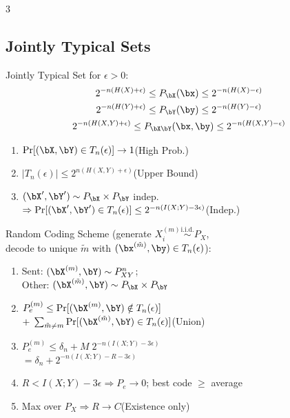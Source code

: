\documentclass[12pt, a4paper]{article}
\begin{document}
\begin{multicols*}{3}
\colbreak
\subsection{Jointly Typical Sets}
Jointly Typical Set for $\epsilon>0$:
\begin{gather*}
  2^{-n(H(X) + \epsilon)} \leq P_{\bX}(\bx) \leq 2^{-n(H(X)-\epsilon)}\\
  2^{-n(H(Y) + \epsilon)} \leq P_{\bY}(\by) \leq 2^{-n(H(Y)-\epsilon)}\\
  2^{-n(H(X, Y) + \epsilon)} \leq P_{\bX\bY}(\bx, \by) \leq 2^{-n(H(X, Y)-\epsilon)}
\end{gather*}
\begin{enumerate}[\roman*.]
  \item $\Pr[(\bX,\bY)\in T_n(\epsilon)]\to 1$\hfill(High Prob.)
  \item $|T_n(\epsilon)|\le 2^{n(H(X,Y)+\epsilon)}$\hfill(Upper Bound)
  \item $(\bX',\bY')\sim P_{\bX}\times P_{\bY}$ indep.\\
    $\Rightarrow\Pr[(\bX',\bY')\in T_n(\epsilon)]\le 2^{-n(I(X;Y)-3\epsilon)}$\hfill(Indep.)
\end{enumerate}
 
Random Coding Scheme (generate $X_i^{(m)}\overset{\text{i.i.d.}}{\sim}P_X$,\\decode to unique $\tilde m$ with $(\bx^{(\tilde m)},\by)\in T_n(\epsilon)$):
\begin{enumerate}[\roman*.]
  \item Sent: $(\bX^{(m)},\bY)\sim P_{XY}^n$;\\Other: $(\bX^{(\tilde m)},\bY)\sim P_{\bX}\times P_{\bY}$
  \item $P_e^{(m)}\le\Pr[(\bX^{(m)},\bY)\notin T_n(\epsilon)]$\\\hspace{3.5em}$+\;\sum_{\tilde m\neq m}\Pr[(\bX^{(\tilde m)},\bY)\in T_n(\epsilon)]$\hfill(Union)
  \item $P_e^{(m)}\le\delta_n+M\;2^{-n(I(X;Y)-3\epsilon)}$\\\hspace{2.5em}$=\delta_n+2^{-n(I(X;Y)-R-3\epsilon)}$
  \item $R<I(X;Y)-3\epsilon\Rightarrow P_e\to 0$; best code $\ge$ average
  \item Max over $P_X\Rightarrow R\to C$\hfill(Existence only)
\end{enumerate}
 

\end{multicols*}
\end{document}

